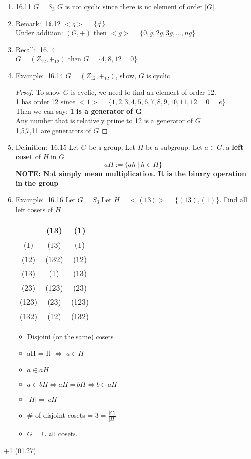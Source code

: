 \documentclass[12pt]{article}
\newcommand{\defi}{{\color{blue} Definition: $\ $}}
\newcommand{\recall}{{\color{blue} Recall: $\ $}}
\newcommand{\exe}{{\color{green} Example: $\ $}}
\newcommand{\rem}{{\color{blue} Remark: $\ $}}
\begin{document}
\begin{enumerate}
\begin{enumerate}
\begin{proof}
        \end{proof}
        \item 16.11 $G=S_3$ $G$ is not cyclic since there is no element of order $|G|$.
        \item \rem 16.12 $<g> = \{g^i\}$\\
        Under addition: $(G,+)$ then $<g> = \{0,g,2g,3g,\dots, ng\}$
        \item \recall 16.14\\
        $G = (Z_12, +_12)$ then $G = \{4,8,12 = 0\}$
        \item \exe 16.14 $G = (Z_12, +_12)$, show, $G$ is cyclic
        \begin{proof}
            To show $G$ is cyclic, we need to find an element of order 12.\\
            1 has order 12 since $<1> = \{1,2,3,4,5,6,7,8,9,10,11,12 = 0 = e\}$\\
            Then we can say: \textbf{1 is a generator of G}\\
            Any number that is relatively prime to 12 is a generator of $G$\\
            1,5,7,11 are generators of $G$
        \end{proof}
        \item \defi 16.15 Let $G$ be a group. Let $H$ be a subgroup. Let $a \in G$. a \textbf{left coset} of $H$ in $G$
        $$aH := \{ah \ | \ h \in H\}$$
        \textbf{NOTE: Not simply mean multiplication. It is the binary operation in the group}
        \item \exe 16.16 Let $G = S_3$ Let $H = <(13)> = \{(13), (1)\}$. Find all left cosets of $H$\\
        \begin{tabular}{c|cc}
            & (13) & (1)\\ \hline
            (1) & (13) & (1)\\
            (12) & (132) & (12)\\
            (13) & (1) & (13)\\
            (23) & (123) & (23)\\
            (123) & (23) & (123)\\
            (132) & (12) & (132)\\
        \end{tabular}
        \begin{itemize}
            \item Disjoint (or the same) cosets
            \item aH = H $\Leftrightarrow$ $a \in H$
            \item $a \in aH$
            \item $a \in bH \Leftrightarrow aH = bH \Leftrightarrow b \in aH$
            \item $|H| = |aH|$
            \item \# of disjoint cosets = 3 = $\frac{|G|}{|H|}$
            \item $G = \cup $ all cosets.
        \end{itemize}
    \end{enumerate}

+1 (01.27)
\end{enumerate}
\end{document}
